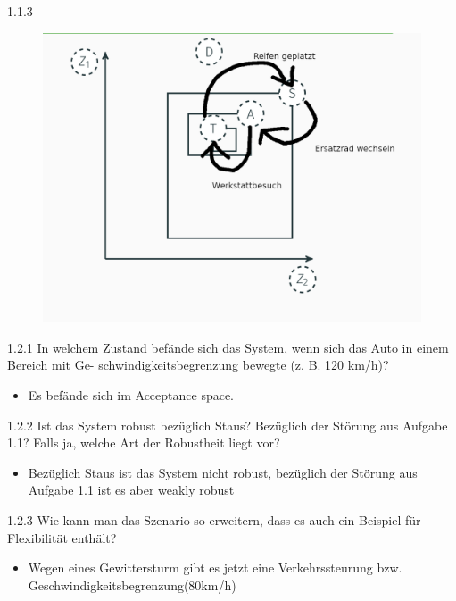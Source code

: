 \documentclass{ocbeameruni}
\begin{document}
\begin{frame}{1.1.3}
    \begin{figure}[H]
    \centering
    \includegraphics[scale=1.0]{oc_1-1-3.png}
    \end{figure}
\end{frame}

\begin{frame}{1.2.1}
In welchem Zustand befände sich das System, wenn sich das Auto in einem Bereich mit Ge-
schwindigkeitsbegrenzung bewegte (z. B. 120 km/h)?
    \begin{itemize}
    \item Es befände sich im Acceptance space.
    \end{itemize}
\end{frame}

\begin{frame}{1.2.2}
Ist das System robust bezüglich Staus? Bezüglich der Störung aus Aufgabe 1.1? Falls ja, welche
Art der Robustheit liegt vor?
    \begin{itemize}
    \item Bezüglich Staus ist das System nicht robust, bezüglich der Störung aus Aufgabe 1.1 ist es aber weakly robust
    \end{itemize}
\end{frame}

\begin{frame}{1.2.3}
Wie kann man das Szenario so erweitern, dass es auch ein Beispiel für Flexibilität enthält?
    \begin{itemize}
    \item Wegen eines Gewittersturm gibt es jetzt eine Verkehrssteurung bzw. Geschwindigkeitsbegrenzung(80km/h)
    \end{itemize}
\end{frame}
\end{document}
